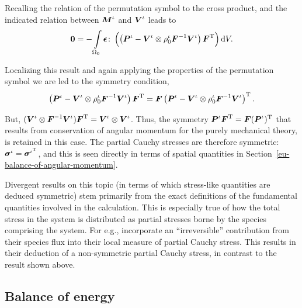 \noindent Recalling the relation of the permutation symbol to the
cross product, and the indicated relation between $\mbox{\boldmath$ M$}^\iota$ and
$\mbox{\boldmath$ V$}^\iota$ leads to
\begin{equation}
{\bf 0} =
-\int\limits_{\Omega_0}\mbox{\boldmath$\epsilon$}\colon\left(\left(\mbox{\boldmath$ P$}^\iota-\mbox{\boldmath$ V$}^\iota
\otimes \rho_0^\iota\mbox{\boldmath$ F$}^{-1}\mbox{\boldmath$ V$}^\iota\right)\mbox{\boldmath$ F$}^\mathrm{T}\right)\mathrm{d}V.
\end{equation}

\noindent Localizing this result and again applying the properties
of the permutation symbol we are led to the symmetry condition,
\begin{equation}
\left(\mbox{\boldmath$ P$}^\iota-\mbox{\boldmath$ V$}^\iota\otimes\rho^\iota_0\mbox{\boldmath$ F$}^{-1}\mbox{\boldmath$ V$}^\iota\right)
\mbox{\boldmath$ F$}^\mathrm{T} = \mbox{\boldmath$ F$}\left(\mbox{\boldmath$ P$}^\iota-\mbox{\boldmath$ V$}^\iota \otimes
\rho^\iota_0\mbox{\boldmath$ F$}^{-1}\mbox{\boldmath$ V$}^\iota\right)^\mathrm{T}.
\label{localbalanceofangularmomentum}
\end{equation}

\noindent But, $(\mbox{\boldmath$ V$}^\iota\otimes\mbox{\boldmath$ F$}^{-1}\mbox{\boldmath$ V$}^\iota)\mbox{\boldmath$ F$}^\mathrm{T} =
\mbox{\boldmath$ V$}^\iota\otimes\mbox{\boldmath$ V$}^\iota$. Thus, the symmetry
$\mbox{\boldmath$ P$}^\iota\mbox{\boldmath$ F$}^\mathrm{T} = \mbox{\boldmath$ F$}(\mbox{\boldmath$ P$}^\iota)^\mathrm{T}$ that results
from conservation of angular momentum for the purely mechanical
theory, is retained in this case. The partial Cauchy stresses are
therefore symmetric: $\mbox{\boldmath$\sigma$}^\iota = \mbox{\boldmath$\sigma$}^{\iota^\mathrm{T}}$, and
this is seen directly in terms of spatial quantities in
Section~\ref{eu-balance-of-angular-momentum}.

Divergent results on this topic (in terms of which stress-like
quantities are deduced symmetric) stem primarily from the exact
definitions of the fundamental quantities involved in the
calculation. This is especially true of how the total stress in the
system is distributed as partial stresses borne by the species
comprising the system. For e.g., \citet{EpsteinMaugin:2000}
incorporate an ``irreversible'' contribution from their species flux
into their local measure of partial Cauchy stress. This results in
their deduction of a non-symmetric partial Cauchy stress, in contrast
to the result shown above.

\subsection{Balance of energy}
\label{balance-of-energy}

